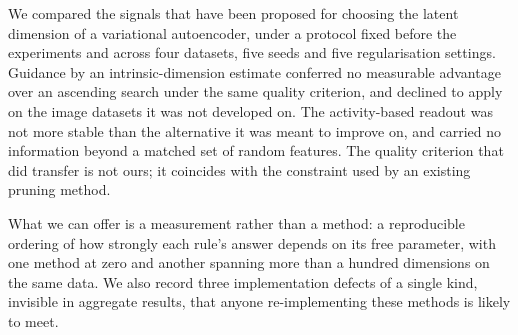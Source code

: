 \documentclass[make,article,submit,pdftex,moreauthors]{Definitions/mdpi}
\begin{document}
We compared the signals that have been proposed for choosing the latent
dimension of a variational autoencoder, under a protocol fixed before the
experiments and across four datasets, five seeds and five regularisation
settings. Guidance by an intrinsic-dimension estimate conferred no
measurable advantage over an ascending search under the same quality
criterion, and declined to apply on the image datasets it was not
developed on. The activity-based readout was not more stable than the
alternative it was meant to improve on, and carried no information beyond
a matched set of random features. The quality criterion that did transfer
is not ours; it coincides with the constraint used by an existing pruning
method.

What we can offer is a measurement rather than a method: a reproducible
ordering of how strongly each rule's answer depends on its free parameter,
with one method at zero and another spanning more than a hundred
dimensions on the same data. We also record three implementation defects
of a single kind, invisible in aggregate results, that anyone
re-implementing these methods is likely to meet.
\end{document}
